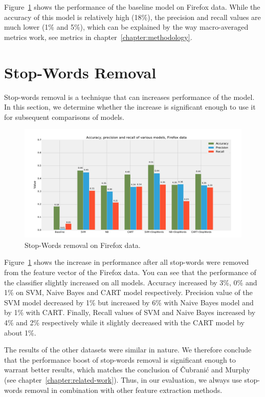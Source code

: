 Figure~\ref{fig:models.firefox.stopwords} shows the performance of the baseline model on Firefox data. While the accuracy of this model is relatively high (18\%), the precision and recall values are much lower (1\% and 5\%), which can be explained by the way macro-averaged metrics work, see metrics in chapter~\ref{chapter:methodology}. 

\section{Stop-Words Removal}

Stop-words removal is a technique that can increases performance of the model. In this section, we determine whether the increase is significant enough to use it for subsequent comparisons of models.

\begin{figure}[htbp]
    \centering
        \includegraphics[width=\textwidth]{./images/comparison_of_models/firefox_0.pdf}
    \caption{Stop-Words removal on Firefox data.}
    \label{fig:models.firefox.stopwords}
\end{figure}

Figure~\ref{fig:models.firefox.stopwords} shows the increase in performance after all stop-words were removed from the feature vector of the Firefox data. You can see that the performance of the classifier slightly increased on all models. Accuracy increased by 3\%, 0\% and 1\% on SVM, Naive Bayes and CART model respectively. Precision value of the SVM model decreased by 1\% but increased by 6\% with Naive Bayes model and by 1\% with CART. Finally, Recall values of SVM and Naive Bayes increased by 4\% and 2\% respectively while it slightly decreased with the CART model by about 1\%.

The results of the other datasets were similar in nature. We therefore conclude that the performance boost of stop-words removal is significant enough to warrant better results, which matches the conclusion of Čubranić and Murphy~\cite{Murphy} (see chapter~\ref{chapter:related-work}). Thus, in our evaluation, we always use stop-words removal in combination with other feature extraction methods.

